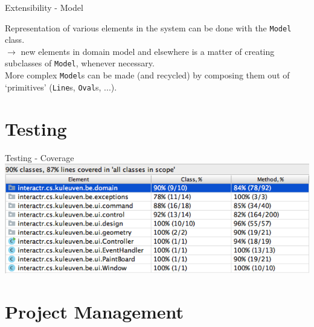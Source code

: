 \documentclass[10pt]{beamer}
\begin{document}
\begin{frame}[fragile]{Extensibility - Model}
	\begin{center}
	Representation of various elements in the system can be done with the \texttt{Model} class.\\
	$\rightarrow $ new elements in domain model and elsewhere is a matter of creating subclasses of \texttt{Model}, whenever necessary.\\
	\vspace{0.5cm}
	More complex \texttt{Model}s can be made (and recycled) by composing them out of `primitives' (\texttt{Line}s, \texttt{Oval}s, ...).
	\end{center}
\end{frame}

\section{Testing}

\begin{frame}[fragile]{Testing - Coverage}
	\includegraphics[width=1\textwidth]{coverage}
\end{frame}

\section{Project Management}

\end{document}
